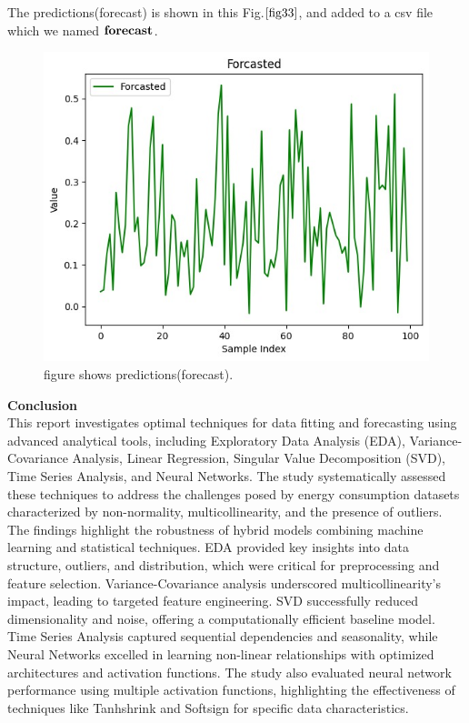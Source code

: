 \documentclass[english,12pt, titlepage]{article}
\begin{document}
	
	The predictions(forecast) is shown in this  Fig.$\ref{fig33}$, and added to a csv file which we named $\text{\textbf{forecast}}$.
	
	\begin{figure}[!ht]
		\centering
		\includegraphics[width=0.4\linewidth]{fig24.jpeg}
		\caption{figure shows predictions(forecast).}\label{fig33}
	\end{figure}
	
	
	
	
	
	\clearpage
	
	\textbf{\Large {Conclusion}}\\
	\newline
	This report investigates optimal techniques for data fitting and forecasting using advanced analytical tools, including Exploratory Data Analysis (EDA), Variance-Covariance Analysis, Linear Regression, Singular Value Decomposition (SVD), Time Series Analysis, and Neural Networks. The study systematically assessed these techniques to address the challenges posed by energy consumption datasets characterized by non-normality, multicollinearity, and the presence of outliers.\\
	
	The findings highlight the robustness of hybrid models combining machine learning and statistical techniques. EDA provided key insights into data structure, outliers, and distribution, which were critical for preprocessing and feature selection. Variance-Covariance analysis underscored multicollinearity's impact, leading to targeted feature engineering. SVD successfully reduced dimensionality and noise, offering a computationally efficient baseline model. Time Series Analysis captured sequential dependencies and seasonality, while Neural Networks excelled in learning non-linear relationships with optimized architectures and activation functions. The study also evaluated neural network performance using multiple activation functions, highlighting the effectiveness of techniques like Tanhshrink and Softsign for specific data characteristics.\\
	
\end{document}
